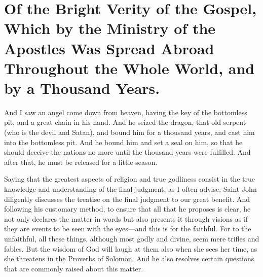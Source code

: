 \chapter[Sermon 87. Of the Bright Verity of the Gospel, Which by the Ministry of the Apostles Was Spread Abroad Throughout the Whole World, and by a Thousand Years.]{Of the Bright Verity of the Gospel, Which by the Ministry of the Apostles Was Spread Abroad Throughout the Whole World, and by a Thousand Years.}
\label{sermon:087}

And I saw an angel come down from heaven, having the key of the bottomless pit, and a great chain in his hand. And he seized the dragon, that old serpent (who is the devil and Satan), and bound him for a thousand years, and cast him into the bottomless pit. And he bound him and set a seal on him, so that he should deceive the nations no more until the thousand years were fulfilled. And after that, he must be released for a little season.

Saying that the greatest aspects of religion and true godliness consist in the true knowledge and understanding of the final judgment, as I often advise: Saint John diligently discusses the treatise on the final judgment to our great benefit. And following his customary method, to ensure that all that he proposes is clear, he not only declares the matter in words but also presents it through visions as if they are events to be seen with the eyes—and this is for the faithful. For to the unfaithful, all these things, although most godly and divine, seem mere trifles and fables. But the wisdom of God will laugh at them also when she sees her time, as she threatens in the Proverbs of Solomon. And he also resolves certain questions that are commonly raised about this matter.

